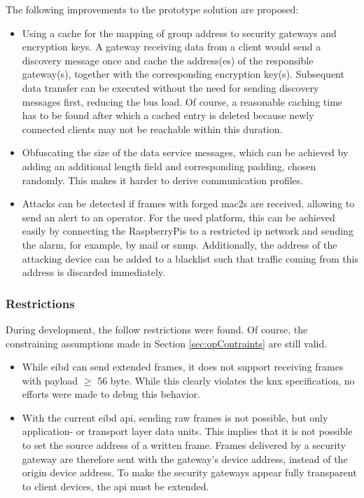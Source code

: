 The following improvements to the prototype solution are proposed: 
\begin{itemize}
 \item Using a cache for the mapping of group address to security gateways and encryption keys. A gateway receiving data from a client would send a discovery message once and
 cache the address(es) of the responsible gateway(s), together with the corresponding encryption key(s). Subsequent data transfer can be executed without the need for sending
 discovery messages first, reducing the bus load. Of course, a reasonable caching time has to be found after which a cached entry is deleted because newly connected
 clients may not be reachable within this duration.
 \item Obfuscating the size of the data service messages, which  can be achieved by adding an additional length field and corresponding padding, chosen randomly. This makes it harder
 to derive communication profiles.
 \item Attacks can be detected if frames with forged \glspl{mac2} are received, allowing to send an alert to an operator. For the used platform, this can be achieved easily by connecting
 the RaspberryPis to a restricted \gls{ip} network and sending the alarm, for example, by mail or \gls{snmp}.
 Additionally, the address of the attacking device can be added to a blacklist such that traffic coming from this address is discarded immediately.
 \end{itemize}
 
\subsubsection{Restrictions }
During development, the follow restrictions were found. Of course, the constraining assumptions made in Section \ref{sec:opContraints} are still valid. 

\begin{itemize}
  \item While \gls{eibd} can send extended frames, it does not support receiving frames with payload $\geq$ 56 byte. While this clearly violates the \gls{knx} specification, no efforts
  were made to debug this behavior.
  \item With the current \gls{eibd} \gls{api}, sending raw frames is not possible, but only application- or transport layer data units. This implies that 
  it is not possible to set the source address of a written frame. Frames delivered by a security gateway are therefore sent with the gateway's device address, instead of the 
  origin device address. To make the security gateways appear fully transparent to client devices, the \gls{api} must be extended.
 \end{itemize}


 
 